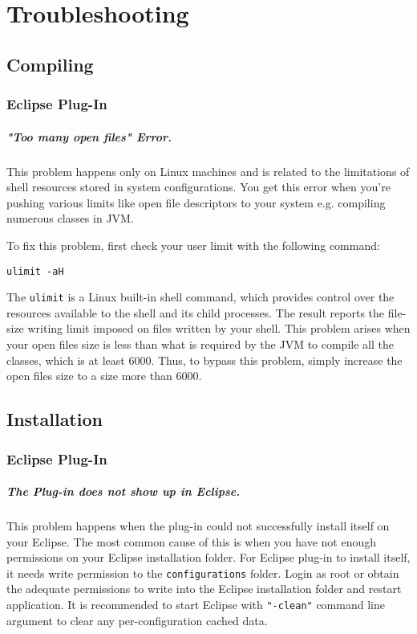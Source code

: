 \chapter{Troubleshooting}
\section{Compiling}
\subsection{Eclipse Plug-In}
\paragraph{"Too many open files" Error.} This problem happens only on Linux
machines and is related to the limitations of shell resources stored in system configurations. You get this error when you're pushing various limits like open file descriptors to your system e.g. compiling numerous classes in JVM.

To fix this problem, first check your user limit with the following command:
\begin{verbatim}
ulimit -aH
\end{verbatim}
The \texttt{ulimit} is a Linux built-in shell command, which provides control over the resources available to the shell and its child processes. The result reports the file-size  writing limit imposed on files written by your shell. This problem arises when your open files size is less than what is required by the JVM to compile all the classes, which is at least 6000. Thus, to bypass this problem, simply increase the open files size to a size more than 6000.

\section{Installation}
\subsection{Eclipse Plug-In}
\paragraph{The Plug-in does not show up in Eclipse.} This problem happens when the plug-in could not successfully install itself on your Eclipse. The most common cause of this is when you have not enough permissions on your Eclipse installation folder. For Eclipse plug-in to install itself, it needs write permission to the \texttt{configurations} folder. Login as root or obtain the adequate permissions to write into the Eclipse installation folder and restart application.
It is recommended to start Eclipse with \texttt{"-clean"} command line argument to clear any per-configuration cached data.